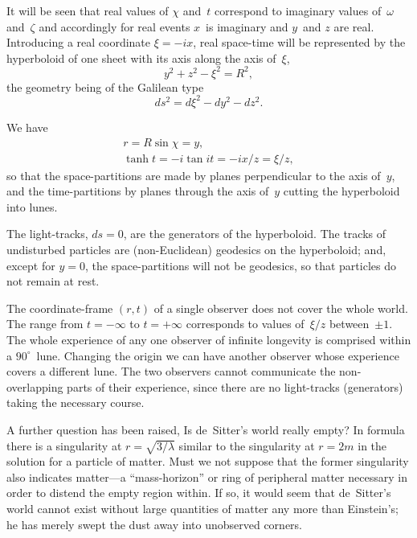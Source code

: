\documentclass[12pt]{book}
\begin{document}
It will be seen that real values of $\chi$ and~$t$ correspond to imaginary
values of~$\omega$ and~$\zeta$ and accordingly for real events $x$~is imaginary and $y$~and
$z$ are real. Introducing a real coordinate $\xi = -ix$, real space-time will be
represented by the hyperboloid of one sheet with its axis along the axis of~$\xi$,
\[
y^{2} + z^{2} - \xi^{2} = R^{2},
\]
the geometry being of the Galilean type
\[
ds^{2} = d\xi^{2} - dy^{2} - dz^{2}.
\]

We have
\begin{gather*}
  r = R\sin\chi = y, \\
  \tanh t = -i\tan it = -ix/z = \xi/z,
\end{gather*}
so that the space-partitions are made by planes perpendicular to the axis of~$y$,
and the time-partitions by planes through the axis of~$y$ cutting the hyperboloid
into lunes.

The light-tracks, $ds = 0$, are the generators of the hyperboloid. The tracks
of undisturbed particles are (non-Euclidean) geodesics on the hyperboloid;
and, except for $y = 0$, the space-partitions will not be geodesics, so that
particles do not remain at rest.

The coordinate-frame $(r, t)$ of a single observer does not cover the whole
world. The range from $t = -\infty$ to $t = +\infty$ corresponds to values of~$\xi/z$
between~$\pm1$. The whole experience of any one observer of infinite longevity
is comprised within a $90^{\circ}$~lune. Changing the origin we can have another
observer whose experience covers a different lune. The two observers cannot
communicate the non-overlapping parts of their experience, since there are
no light-tracks (generators) taking the necessary course.

A further question has been raised, Is de~Sitter's world really empty? In
%
%
formula~ there is a singularity at $r = \sqrt{3/\lambda}$ similar to the singularity
at $r = 2m$ in the solution for a particle of matter. Must we not suppose that
the former singularity also indicates matter---a ``mass-horizon'' or ring of
peripheral matter necessary in order to distend the empty region within. If
so, it would seem that de~Sitter's world cannot exist without large quantities
of matter any more than Einstein's; he has merely swept the dust away into
unobserved corners.
\end{document}
